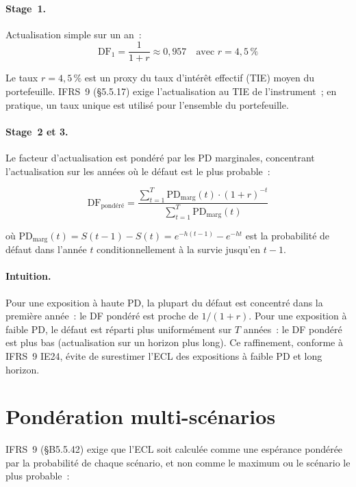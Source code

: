 \documentclass[12pt, a4paper, twoside, openright]{report}
\theoremstyle{definition}
\begin{document}
\paragraph{Stage~1.} Actualisation simple sur un an~:
\begin{equation}
\text{DF}_1 = \frac{1}{1 + r} \approx 0{,}957 \quad \text{avec } r = 4{,}5\,\%
\label{eq:df1}
\end{equation}

Le taux $r = 4{,}5\,\%$ est un proxy du taux d'intérêt effectif (TIE) moyen du portefeuille. IFRS~9 (§5.5.17) exige l'actualisation au TIE de l'instrument~; en pratique, un taux unique est utilisé pour l'ensemble du portefeuille.

\paragraph{Stage~2 et 3.} Le facteur d'actualisation est pondéré par les PD marginales, concentrant l'actualisation sur les années où le défaut est le plus probable~:

\begin{equation}
\text{DF}_{\text{pondéré}} = \frac{\sum_{t=1}^{T} \text{PD}_{\text{marg}}(t) \cdot (1+r)^{-t}}{\sum_{t=1}^{T} \text{PD}_{\text{marg}}(t)}
\label{eq:df-weighted}
\end{equation}

\noindent où $\text{PD}_{\text{marg}}(t) = S(t-1) - S(t) = e^{-h(t-1)} - e^{-ht}$ est la probabilité de défaut dans l'année $t$ conditionnellement à la survie jusqu'en $t-1$.

\paragraph{Intuition.} Pour une exposition à haute PD, la plupart du défaut est concentré dans la première année~: le DF pondéré est proche de $1/(1+r)$. Pour une exposition à faible PD, le défaut est réparti plus uniformément sur $T$ années~: le DF pondéré est plus bas (actualisation sur un horizon plus long). Ce raffinement, conforme à IFRS~9 IE24, évite de surestimer l'ECL des expositions à faible PD et long horizon.

\section{Pondération multi-scénarios}
\label{sec:ecl:scenarios}

IFRS~9 (§B5.5.42) exige que l'ECL soit calculée comme une espérance pondérée par la probabilité de chaque scénario, et non comme le maximum ou le scénario le plus probable~:
\end{document}
